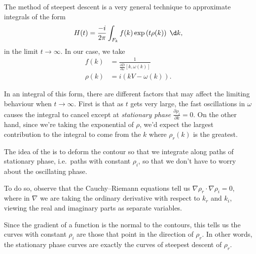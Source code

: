 \documentclass[a4paper]{article}
\begin{document}
The method of steepest descent is a very general technique to approximate integrals of the form
\[
  H(t) = \frac{-i}{2\pi} \int_{F_k} f(k) \exp \left(t \rho(k)\right)\;\d k,
\]
in the limit $t \to \infty$. In our case, we take
\begin{align*}
  f(k) &= \frac{1}{\frac{\partial \tilde{D}}{\partial \omega}[k, \omega(k)]}\\
  \rho\left(k\right) &= i \left(kV - \omega(k)\right).
\end{align*}

In an integral of this form, there are different factors that may affect the limiting behaviour when $t \to \infty$. First is that as $t$ gets very large, the fast oscillations in $\omega$ causes the integral to cancel except at \emph{stationary phase} $\frac{\partial \rho_i}{\partial k} = 0$. On the other hand, since we're taking the exponential of $\rho$, we'd expect the largest contribution to the integral to come from the $k$ where $\rho_r(k)$ is the greatest.

The idea of the  is to deform the contour so that we integrate along paths of stationary phase, i.e.\ paths with constant $\rho_i$, so that we don't have to worry about the oscillating phase.

To do so, observe that the Cauchy--Riemann equations tell us $\nabla \rho_r \cdot \nabla \rho_i = 0$, where in $\nabla$ we are taking the ordinary derivative with respect to $k_r$ and $k_i$, viewing the real and imaginary parts as separate variables.

Since the gradient of a function is the normal to the contours, this tells us the curves with constant $\rho_i$ are those that point in the direction of $\rho_r$. In other words, the stationary phase curves are exactly the curves of steepest descent of $\rho_r$.
\end{document}

